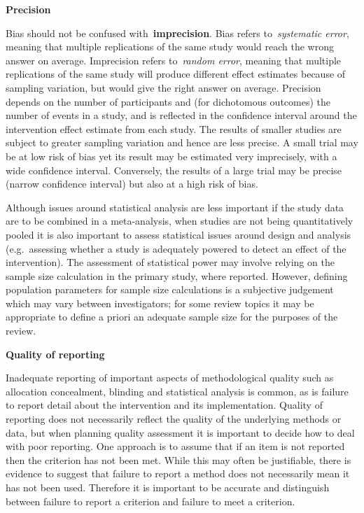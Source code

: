 \documentclass[
  11pt,
  a4paper,
  DIV=11,
  numbers=noendperiod]{scrreprt}
\begin{document}
\textbf{Precision}

Bias should not be confused with~\textbf{imprecision}. Bias refers
to~\emph{systematic error}, meaning that multiple replications of the
same study would reach the wrong answer on average. Imprecision refers
to~\emph{random error}, meaning that multiple replications of the same
study will produce different effect estimates because of sampling
variation, but would give the right answer on average. Precision depends
on the number of participants and (for dichotomous outcomes) the number
of events in a study, and is reflected in the confidence interval around
the intervention effect estimate from each study. The results of smaller
studies are subject to greater sampling variation and hence are less
precise. A small trial may be at low risk of bias yet its result may be
estimated very imprecisely, with a wide confidence interval. Conversely,
the results of a large trial may be precise (narrow confidence interval)
but also at a high risk of bias.

Although issues around statistical analysis are less important if the
study data are to be combined in a meta-analysis, when studies are not
being quantitatively pooled it is also important to assess statistical
issues around design and analysis (e.g.~assessing whether a study is
adequately powered to detect an effect of the intervention). The
assessment of statistical power may involve relying on the sample size
calculation in the primary study, where reported. However, defining
population parameters for sample size calculations is a subjective
judgement which may vary between investigators; for some review topics
it may be appropriate to define a priori an adequate sample size for the
purposes of the review.

\textbf{Quality of reporting}

Inadequate reporting of important aspects of methodological quality such
as allocation concealment, blinding and statistical analysis is common,
as is failure to report detail about the intervention and its
implementation. Quality of reporting does not necessarily reflect the
quality of the underlying methods or data, but when planning quality
assessment it is important to decide how to deal with poor reporting.
One approach is to assume that if an item is not reported then the
criterion has not been met. While this may often be justifiable, there
is evidence to suggest that failure to report a method does not
necessarily mean it has not been used. Therefore it is important to be
accurate and distinguish between failure to report a criterion and
failure to meet a criterion.
\end{document}

